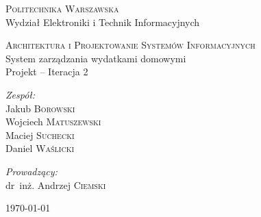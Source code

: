 \documentclass[parindent=0pt,11pt,a4paper]{article}
\begin{document}
\begin{titlepage}
  \begin{center}

    \textsc{\Large Politechnika Warszawska}\\[0.1cm]
    \small Wydział Elektroniki i Technik Informacyjnych
    \vfill

    \textsc{\small Architektura i Projektowanie Systemów Informacyjnych}\\[0.1cm]
    \Huge System zarządzania wydatkami domowymi\\[1.5cm]
    \small Projekt -- Iteracja 2\\[2.5cm]

    \vfill

    \begin{minipage}{0.4\textwidth}
      \begin{flushleft} \large
        \emph{Zespół:}\\[0.1cm]
        Jakub \textsc{Borowski}\\
        Wojciech \textsc{Matuszewski}\\
        Maciej \textsc{Suchecki}\\
        Daniel \textsc{Waślicki}\\
      \end{flushleft}
    \end{minipage}
    \begin{minipage}{0.4\textwidth}
      \begin{flushright} \large
        \emph{Prowadzący:}\\[0.1cm]
        dr~inż. Andrzej \textsc{Ciemski}\\[1cm]
      \end{flushright}
    \end{minipage}

    \vfill
    {\large \today}

  \end{center}
\end{titlepage}

\newpage
\tableofcontents

\newpage

\newpage

\newpage

\newpage

\newpage

\newpage

\end{document}
